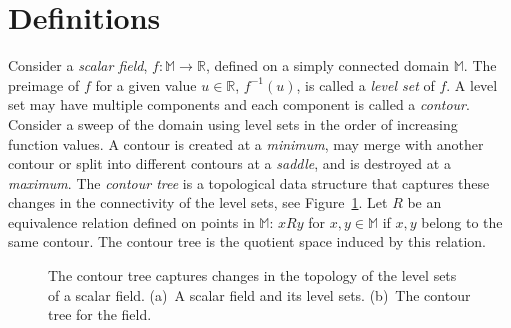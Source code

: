 \documentclass[review,journal]{vgtc}         %
\begin{document}
\section{Definitions}
Consider a \emph{scalar field}, $f : \mathbb{M}  \rightarrow \mathbb{R}$, defined on a 
simply connected domain $\mathbb{M}$. The preimage of $f$ for a given value $u \in \mathbb{R}$, 
$f^{-1}(u)$, is called a \emph{level set} of $f$. A level set may have multiple components
and each component is called a \emph{contour}. Consider a sweep of the domain using level sets in the order
of increasing function values. A contour is created at a \emph{minimum}, may merge
with another contour or split into different contours at a \emph{saddle}, and is destroyed
at a \emph{maximum}. The \emph{contour tree} is a topological 
data structure that captures these changes in the connectivity of the level sets, see Figure~\ref{ct}.
Let $R$ be an equivalence relation defined on points in $\mathbb{M}$: $xRy$ for $x,y 
\in \mathbb{M}$  if $x,y$ belong to the same contour. The contour tree is the quotient space 
induced by this relation. 
\begin{figure}
	\centering
	\hspace{0.2cm}
	\caption{\label{ct}The contour tree captures changes in the topology of the level sets of a scalar field. 
	(a)~A scalar field and its level sets. (b)~The contour tree for the field.}
\end{figure}
\end{document}
